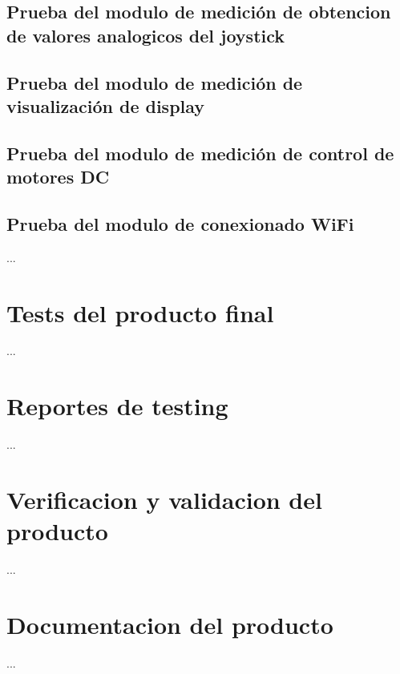 \subsection{Prueba del modulo de medición de obtencion de valores analogicos del joystick}

\subsection{Prueba del modulo de medición de visualización de display}

\subsection{Prueba del modulo de medición de control de motores DC}

\subsection{Prueba del modulo de conexionado WiFi}

...

\section{Tests del producto final}
\label{sec:pruebasHW}

...

\section{Reportes de testing}
\label{sec:pruebasHW}

...

\section{Verificacion y validacion del producto}
\label{sec:pruebasHW}

...

\section{Documentacion del producto }
\label{sec:pruebasHW}

...



